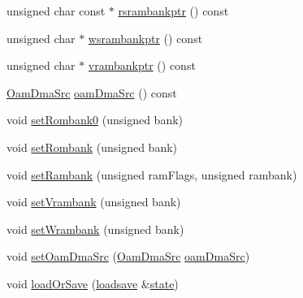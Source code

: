 \begin{DoxyCompactItemize}
\item 
unsigned char const  $\ast$ \hyperlink{classgambatte_1_1MemPtrs_acf6facd9213e2f07f21194cb087734db}{rsrambankptr} () const
\item 
unsigned char $\ast$ \hyperlink{classgambatte_1_1MemPtrs_acd52f8d1306c19c289ae0cef9800e7c2}{wsrambankptr} () const
\item 
unsigned char $\ast$ \hyperlink{classgambatte_1_1MemPtrs_a7f0f856f9a995583e6e682c4050ab2aa}{vrambankptr} () const
\item 
\hyperlink{namespacegambatte_a2c5520a5fadf732ba8907450d802f51b}{Oam\+Dma\+Src} \hyperlink{classgambatte_1_1MemPtrs_a04faf27c55fc11a0fc9901e155a791cc}{oam\+Dma\+Src} () const
\item 
void \hyperlink{classgambatte_1_1MemPtrs_a663aea3ca0337c4605ed0a6b3690731e}{set\+Rombank0} (unsigned bank)
\item 
void \hyperlink{classgambatte_1_1MemPtrs_a443229e524ea04072df4689c60b375fc}{set\+Rombank} (unsigned bank)
\item 
void \hyperlink{classgambatte_1_1MemPtrs_a5362761de284b26ada7fbffc98a46934}{set\+Rambank} (unsigned ram\+Flags, unsigned rambank)
\item 
void \hyperlink{classgambatte_1_1MemPtrs_a6be5cb73470419ac270e309d00df39ce}{set\+Vrambank} (unsigned bank)
\item 
void \hyperlink{classgambatte_1_1MemPtrs_acceb60b6f1e0b0dfab532cd6d34b6126}{set\+Wrambank} (unsigned bank)
\item 
void \hyperlink{classgambatte_1_1MemPtrs_ad2b67ac189e0901d10af25403ce6e694}{set\+Oam\+Dma\+Src} (\hyperlink{namespacegambatte_a2c5520a5fadf732ba8907450d802f51b}{Oam\+Dma\+Src} \hyperlink{classgambatte_1_1MemPtrs_a04faf27c55fc11a0fc9901e155a791cc}{oam\+Dma\+Src})
\item 
void \hyperlink{classgambatte_1_1MemPtrs_a788e2f0d281b97c25177051422d9fa9c}{load\+Or\+Save} (\hyperlink{classgambatte_1_1loadsave}{loadsave} \&\hyperlink{ppu_8cpp_a2f2eca6997ee7baf8901725ae074d45b}{state})
\end{DoxyCompactItemize}
